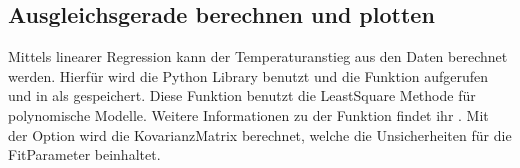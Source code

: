 \documentclass[letterpaper,10pt,english]{jupyterBook}
\begin{document}
\subsection{Ausgleichsgerade berechnen und plotten}
\label{\detokenize{content/1_APy_Plotten:ausgleichsgerade-berechnen-und-plotten}}
\sphinxAtStartPar
Mittels linearer Regression kann der Temperaturanstieg aus den Daten berechnet werden. Hierfür wird die Python Library  benutzt und die Funktion  aufgerufen und in als  gespeichert. Diese Funktion benutzt die Least\sphinxhyphen{}Square Methode für polynomische Modelle. Weitere Informationen zu der Funktion findet ihr . Mit der Option  wird die Kovarianz\sphinxhyphen{}Matrix berechnet, welche die Unsicherheiten für die Fit\sphinxhyphen{}Parameter beinhaltet.
\end{document}
